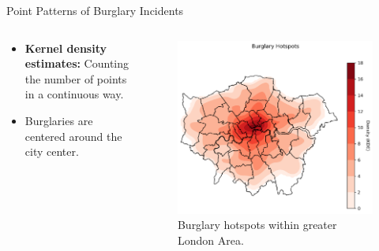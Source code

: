 \documentclass[10pt, aspectratio=169]{beamer}
\begin{document}
\begin{frame}{Point Patterns of Burglary Incidents}
    \begin{columns}
        \begin{column}{0.5\textwidth}
            \begin{itemize}
                \item \textbf{Kernel density estimates:} Counting the number of points in a continuous way.
                \item Burglaries are centered around the city center.
            \end{itemize}
        \end{column}
        \begin{column}{0.5\textwidth}
            \begin{figure}
            \centering
                \includegraphics[width=1.0\textwidth]{burglary_hotspots.png}
                \caption{Burglary hotspots within greater London Area.}
            \end{figure}
        \end{column}
    \end{columns}
\end{frame}
\end{document}
